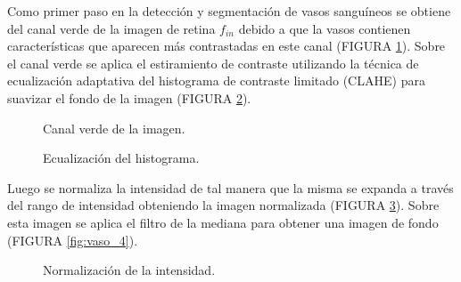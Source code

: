 Como primer paso en la detección y segmentación de vasos sanguíneos se obtiene del canal verde de la imagen de retina $f_{in}$ debido a que la vasos contienen características que aparecen más contrastadas en este canal (FIGURA \ref{fig:vaso_1}). Sobre el canal verde se aplica el estiramiento de contraste utilizando la técnica de ecualización adaptativa del histograma de contraste limitado (CLAHE) \cite{zuiderveld1994contrast} para suavizar el fondo de la imagen (FIGURA \ref{fig:vaso_2}).
\begin{figure}[H]
\centering
{}
\caption{Canal verde de la imagen.} \label{fig:vaso_1}
\end{figure}


\begin{figure}[H]
\centering
{}
\caption{Ecualización del histograma.} \label{fig:vaso_2}
\end{figure}

Luego se normaliza la intensidad de tal manera que la misma se expanda a través del rango de intensidad obteniendo la imagen normalizada (FIGURA \ref{fig:vaso_3}). Sobre esta imagen se aplica el filtro de la mediana para obtener una imagen de fondo (FIGURA \ref{fig:vaso_4}).
 
\begin{figure}[H]
\centering
{}
\caption{Normalización de la intensidad.} \label{fig:vaso_3}
\end{figure}



